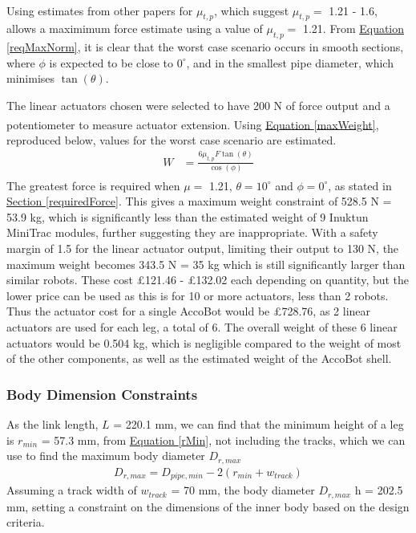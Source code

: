 \documentclass[11pt]{article}		%
\newcommand{\supercite}[1]{\textsuperscript{\cite{#1}}}		%
\newcommand{\equationref}[1]{\hyperref[#1]{Equation \ref*{#1}}}     %
\newcommand{\sectref}[1]{\hyperref[#1]{Section \ref*{#1}}}     %
\begin{document}
				Using estimates from other papers for $\mu_{t,p}$, which suggest $\mu_{t,p} = $ 1.21\supercite{sato2011development} - 1.6\supercite{park2010normal}, allows a maximimum force estimate using a value of $\mu_{t,p} = $ 1.21.
				From \equationref{reqMaxNorm}, it is clear that the worst case scenario occurs in smooth sections, where $\phi$ is expected to be close to $0^\circ$, and in the smallest pipe diameter, which minimises $\tan \left( \theta \right)$.
				
				The linear actuators chosen were selected to have 200 N of force output and a potentiometer to measure actuator extension\supercite{rsproLinear}.
				Using \equationref{maxWeight}, reproduced below, values for the worst case scenario are estimated.
				\begin{align*}
					W &= \frac{6 \mu_{t,p} F \tan \left( \theta \right)}{\cos \left( \phi \right)}
				\end{align*}
				The greatest force is required when $\mu =$ 1.21\supercite{sato2011development}, $\theta = 10^\circ$ and $\phi = 0^\circ$, as stated in \sectref{requiredForce}.
				This gives a maximum weight constraint of 528.5 N = 53.9 kg, which is significantly less than the estimated weight of 9 Inuktun MiniTrac modules, further suggesting they are inappropriate.
				With a safety margin of 1.5 for the linear actuator output, limiting their output to 130 N, the maximum weight becomes 343.5 N = 35 kg which is still significantly larger than similar robots.
				These cost £121.46 - £132.02 each depending on quantity, but the lower price can be used as this is for 10 or more actuators, less than 2 robots.
				Thus the actuator cost for a single AccoBot would be £728.76, as 2 linear actuators are used for each leg, a total of 6.
				The overall weight of these 6 linear actuators would be 0.504 kg, which is negligible compared to the weight of most of the other components, as well as the estimated weight of the AccoBot shell.
				
			\subsubsection{Body Dimension Constraints}
			
    		    As the link length, $L$ = 220.1 mm, we can find that the minimum height of a leg is $r_{min}$ = 57.3 mm, from \equationref{rMin}, not including the tracks, which we can use to find the maximum body diameter $D_{r,max}$
    			\begin{align}
    				D_{r,max} = D_{pipe,min} - 2 \left(r_{min} + w_{track} \right)
    			\end{align}
    			Assuming a track width of $w_{track}$ = 70 mm, the body diameter $D_{r,max}$ h = 202.5 mm, setting a constraint on the dimensions of the inner body based on the design criteria.
    			
\end{document}
